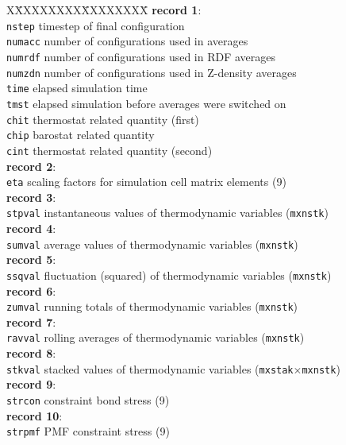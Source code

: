 \begin{tabbing}
X\=XXXXXXXX\=XXXXXXXX\=\kill
{\bf record 1}: \\
\> {\tt nstep}  \> timestep of final configuration \\
\> {\tt numacc} \> number of configurations used in averages \\
\> {\tt numrdf} \> number of configurations used in RDF averages \\
\> {\tt numzdn} \> number of configurations used in Z-density averages \\
\> {\tt time}   \> elapsed simulation time \\
\> {\tt tmst}   \> elapsed simulation before averages were switched on \\
\> {\tt chit}   \> thermostat related quantity (first) \\
\> {\tt chip}   \> barostat related quantity \\
\> {\tt cint}   \> thermostat related quantity (second) \\
{\bf record 2}: \\
\> {\tt eta}    \>  scaling factors for simulation cell matrix elements (9) \\
{\bf record 3}: \\
\> {\tt stpval} \>  instantaneous values of thermodynamic variables ({\tt mxnstk}) \\
{\bf record 4}: \\
\> {\tt sumval} \>  average values of thermodynamic variables ({\tt mxnstk}) \\
{\bf record 5}: \\
\> {\tt ssqval} \>  fluctuation (squared) of thermodynamic variables ({\tt mxnstk}) \\
{\bf record 6}: \\
\> {\tt zumval} \>  running totals of thermodynamic variables ({\tt mxnstk}) \\
{\bf record 7}: \\
\> {\tt ravval} \>  rolling averages of thermodynamic variables ({\tt mxnstk}) \\
{\bf record 8}: \\
\> {\tt stkval} \>  stacked values of thermodynamic variables ({\tt mxstak}$\times${\tt mxnstk}) \\
{\bf record 9}: \\
\> {\tt strcon} \>  constraint bond stress (9) \\
{\bf record 10}: \\
\> {\tt strpmf} \>  PMF constraint stress (9) \\

\end{tabbing}
